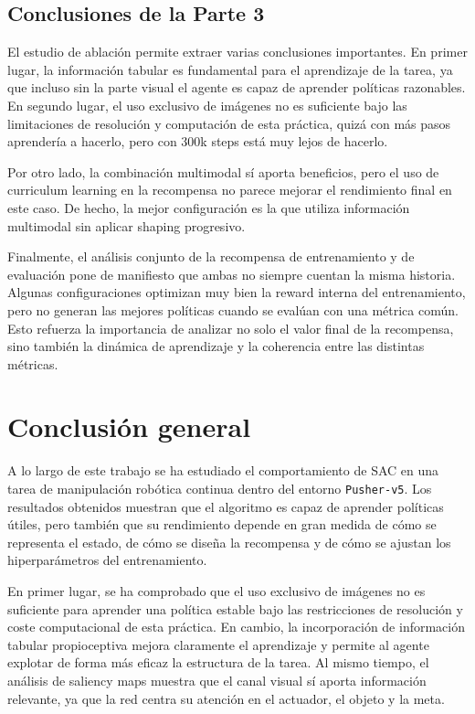 \documentclass[10pt,twocolumn]{article}
\begin{document}
\subsection{Conclusiones de la Parte 3}

El estudio de ablación permite extraer varias conclusiones importantes. En primer lugar, la información tabular es fundamental para el aprendizaje de la tarea, ya que incluso sin la parte visual el agente es capaz de aprender políticas razonables. En segundo lugar, el uso exclusivo de imágenes no es suficiente bajo las limitaciones de resolución y computación de esta práctica, quizá con más pasos aprendería a hacerlo, pero con 300k steps está muy lejos de hacerlo.

Por otro lado, la combinación multimodal sí aporta beneficios, pero el uso de curriculum learning en la recompensa no parece mejorar el rendimiento final en este caso. De hecho, la mejor configuración es la que utiliza información multimodal sin aplicar shaping progresivo. 

Finalmente, el análisis conjunto de la recompensa de entrenamiento y de evaluación pone de manifiesto que ambas no siempre cuentan la misma historia. Algunas configuraciones optimizan muy bien la reward interna del entrenamiento, pero no generan las mejores políticas cuando se evalúan con una métrica común. Esto refuerza la importancia de analizar no solo el valor final de la recompensa, sino también la dinámica de aprendizaje y la coherencia entre las distintas métricas.
\section{Conclusión general}

A lo largo de este trabajo se ha estudiado el comportamiento de SAC en una tarea de manipulación robótica continua dentro del entorno \texttt{Pusher-v5}. Los resultados obtenidos muestran que el algoritmo es capaz de aprender políticas útiles, pero también que su rendimiento depende en gran medida de cómo se representa el estado, de cómo se diseña la recompensa y de cómo se ajustan los hiperparámetros del entrenamiento.

En primer lugar, se ha comprobado que el uso exclusivo de imágenes no es suficiente para aprender una política estable bajo las restricciones de resolución y coste computacional de esta práctica. En cambio, la incorporación de información tabular propioceptiva mejora claramente el aprendizaje y permite al agente explotar de forma más eficaz la estructura de la tarea. Al mismo tiempo, el análisis de saliency maps muestra que el canal visual sí aporta información relevante, ya que la red centra su atención en el actuador, el objeto y la meta.
\end{document}
